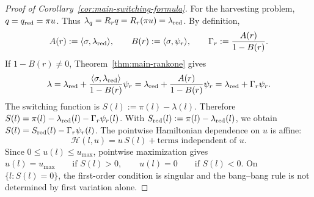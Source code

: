 \documentclass[pdflatex,sn-mathphys-num]{sn-jnl}
\theoremstyle{thmstyleone}
\theoremstyle{definition}
\theoremstyle{remark}
\numberwithin{equation}{section}
\begin{document}
\begin{proof}[Proof of Corollary~\ref{cor:main-switching-formula}]
For the harvesting problem,
$\displaystyle 
q=q_{\rm red}=\pi u$.
Thus
$\displaystyle 
\lambda_q
=
R_rq
=
R_r(\pi u)
=
\lambda_{\rm red}$.
By definition,
\[
A(r):=\langle\sigma,\lambda_{\rm red}\rangle,
\qquad
B(r):=\langle\sigma,\psi_r\rangle,
\qquad
\Gamma_r:=\frac{A(r)}{1-B(r)}.
\]
If
$\displaystyle 
1-B(r)\ne0$,
Theorem~\ref{thm:main-rankone} gives
\[
\lambda
=
\lambda_{\rm red}
+
\frac{\langle\sigma,\lambda_{\rm red}\rangle}{1-B(r)}\psi_r
=
\lambda_{\rm red}
+
\frac{A(r)}{1-B(r)}\psi_r
=
\lambda_{\rm red}+\Gamma_r\psi_r.
\]
The switching function is
$\displaystyle 
S(l):=\pi(l)-\lambda(l)$.
Therefore
$\displaystyle 
S(l)
=
\pi(l)-\lambda_{\rm red}(l)-\Gamma_r\psi_r(l)$.
With
$\displaystyle 
S_{\rm red}(l):=\pi(l)-\lambda_{\rm red}(l)$,
we obtain
$\displaystyle 
S(l)=S_{\rm red}(l)-\Gamma_r\psi_r(l)$.
The pointwise Hamiltonian dependence on \(u\) is affine:
\[
\mathscr H(l,u)
=
u\,S(l)+\text{terms independent of }u.
\]
Since
$\displaystyle 
0\le u(l)\le u_{\max}$,
pointwise maximization gives
$\displaystyle 
u(l)=u_{\max}
\qquad\text{if }S(l)>0,
\qquad
u(l)=0
\qquad\text{if }S(l)<0$.
On
$\displaystyle 
\{l:S(l)=0\}$,
the first-order condition is singular and the bang--bang rule is not determined
by first variation alone.
\end{proof}
\end{document}

